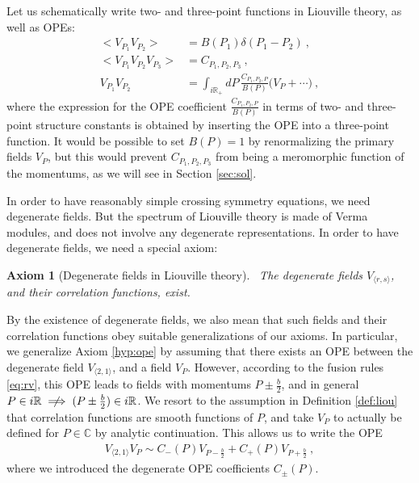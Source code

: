 \documentclass[12pt, a4paper]{article}
\theoremstyle{break}
\newtheorem{hyp}[exo]{Axiom}
\begin{document}
Let us schematically write two- and three-point functions in Liouville theory, as well as OPEs:
\begin{align}
 \Big< V_{P_1}V_{P_2} \Big>  &=  B(P_1)\delta(P_1-P_2)\ ,
 \label{eq:vv}
 \\
 \Big< V_{P_1}V_{P_2}V_{P_3} \Big> & = C_{P_1,P_2,P_3} \ ,
 \label{eq:vvv}
 \\
 V_{P_1}V_{P_2} &= \int_{i\mathbb{R}_+} dP\, \frac{C_{P_1,P_2,P}}{B(P)} \Big( V_P + \cdots\Big)\ ,
 \label{eq:v1v2}
\end{align}
where the expression for the OPE coefficient $\frac{C_{P_1,P_2,P}}{B(P)}$ in terms of two- and three-point structure constants is obtained by inserting the OPE into a three-point function. 
It would be possible to set $B(P)=1$ by renormalizing the primary fields $V_{P}$, but this would prevent $C_{P_1,P_2,P_3}$ from being a meromorphic function of the momentums, as we will see in Section \ref{sec:sol}.

In order to have reasonably simple crossing symmetry equations, we need degenerate fields. 
But the spectrum of Liouville theory is made of Verma modules, and does not involve any degenerate representations.
In order to have degenerate fields, we need a special axiom:

\begin{hyp}[Degenerate fields in Liouville theory]
 ~\label{hyp:degl}
 The degenerate fields $V_{\langle r, s\rangle}$, and their correlation functions, exist. 
\end{hyp}
By the existence of degenerate fields, we also mean that such fields and their correlation functions obey suitable generalizations of our axioms. 
In particular, we generalize Axiom \ref{hyp:ope} by assuming that there exists an OPE between the degenerate field $V_{\langle 2, 1\rangle}$, and a field $V_P$. 
However, according to the fusion rules \eqref{eq:rv}, this OPE leads to fields with momentums $P\pm \frac{b}{2}$, and in general
$P \in i\mathbb{R} \centernot\implies (P\pm\frac{b}{2}) \in i\mathbb{R}$.
We resort to the assumption in Definition \ref{def:liou} that correlation functions are smooth functions of $P$, and take $V_P$ to actually be defined for $P\in\mathbb{C}$ by analytic continuation. This allows us to write the OPE
\begin{align}
 V_{\langle 2, 1\rangle} V_P \sim C_-(P) V_{P-\frac{b}{2}} + C_+(P)V_{P +\frac{b}{2}}\ ,
 \label{degope}
\end{align}
where we introduced the degenerate OPE coefficients $C_\pm(P)$.
\end{document}
